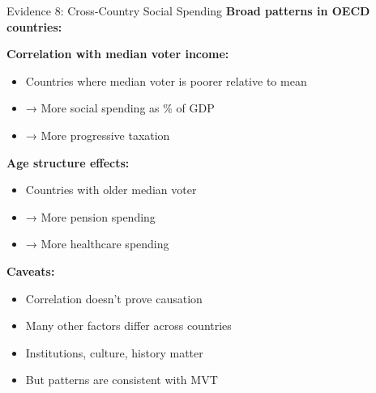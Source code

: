 \documentclass[10pt]{beamer}
\begin{document}
\begin{frame}{Evidence 8: Cross-Country Social Spending}
\textbf{Broad patterns in OECD countries:}



\textbf{Correlation with median voter income:}
\begin{itemize}
\item Countries where median voter is poorer relative to mean
\item → More social spending as \% of GDP
\item → More progressive taxation
\end{itemize}



\textbf{Age structure effects:}
\begin{itemize}
\item Countries with older median voter
\item → More pension spending
\item → More healthcare spending
\end{itemize}



\textbf{Caveats:}
\begin{itemize}
\item Correlation doesn't prove causation
\item Many other factors differ across countries
\item Institutions, culture, history matter
\item But patterns are \alert{consistent with MVT}
\end{itemize}
\end{frame}
\end{document}
